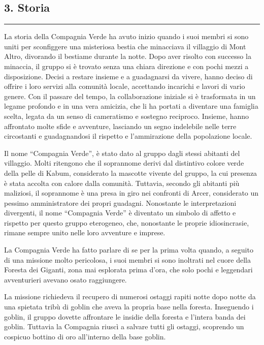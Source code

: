 \subsection{3. Storia}\label{storia}

\begin{center}\rule{0.5\linewidth}{0.5pt}\end{center}

La storia della Compagnia Verde ha avuto inizio quando i suoi membri si
sono uniti per sconfiggere una misteriosa bestia che minacciava il
villaggio di Mont Altro, divorando il bestiame durante la notte. Dopo
aver risolto con successo la minaccia, il gruppo si è trovato senza una
chiara direzione e con pochi mezzi a disposizione. Decisi a restare
insieme e a guadagnarsi da vivere, hanno deciso di offrire i loro
servizi alla comunità locale, accettando incarichi e lavori di vario
genere. Con il passare del tempo, la collaborazione iniziale si è
trasformata in un legame profondo e in una vera amicizia, che li ha
portati a diventare una famiglia scelta, legata da un senso di
cameratismo e sostegno reciproco. Insieme, hanno affrontato molte sfide
e avventure, lasciando un segno indelebile nelle terre circostanti e
guadagnandosi il rispetto e l'ammirazione della popolazione locale.

Il nome ``Compagnia Verde'', è stato dato al gruppo dagli stessi
abitanti del villaggio. Molti ritengono che il soprannome derivi dal
distintivo colore verde della pelle di Kabum, considerato la mascotte
vivente del gruppo, la cui presenza è stata accolta con calore dalla
comunità. Tuttavia, secondo gli abitanti più maliziosi, il soprannome è
una presa in giro nei confronti di Arcer, considerato un pessimo
amministratore dei propri guadagni. Nonostante le interpretazioni
divergenti, il nome ``Compagnia Verde'' è diventato un simbolo di
affetto e rispetto per questo gruppo eterogeneo, che, nonostante le
proprie idiosincrasie, rimane sempre unito nelle loro avventure e
imprese.

La Compagnia Verde ha fatto parlare di se per la prima volta quando, a
seguito di una missione molto pericolosa, i suoi membri si sono
inoltrati nel cuore della Foresta dei Giganti, zona mai esplorata prima
d'ora, che solo pochi e leggendari avventurieri avevano osato
raggiungere.

La missione richiedeva il recupero di numerosi ostaggi rapiti notte dopo
notte da una spietata tribù di goblin che aveva la propria base nella
foresta. Inseguendo i goblin, il gruppo dovette affrontare le insidie
della foresta e l'intera banda dei goblin. Tuttavia la Compagnia riuscì
a salvare tutti gli ostaggi, scoprendo un cospicuo bottino di oro
all'interno della base goblin.

